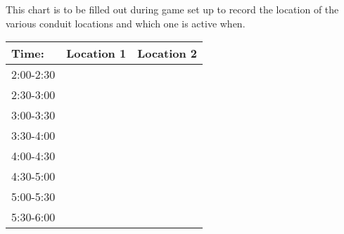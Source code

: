 \documentclass[green]{elementals}
\begin{document}
\name{\gActiveConduitLocations{}}

This chart is to be filled out during game set up to record the location of the various conduit locations and which one is active when.

\begin{tabular}{ l || l | l |}
  Time: & Location 1 & Location 2 \\ \hline \hline
  2:00-2:30 & \hspace{50mm} & \hspace{50mm} \\ \hline
  2:30-3:00 & \hspace{50mm} & \hspace{50mm} \\ \hline
  3:00-3:30 & \hspace{50mm} & \hspace{50mm} \\ \hline
  3:30-4:00 & \hspace{50mm} & \hspace{50mm} \\ \hline
  4:00-4:30 & \hspace{50mm} & \hspace{50mm} \\ \hline
  4:30-5:00 & \hspace{50mm} & \hspace{50mm} \\ \hline
  5:00-5:30 & \hspace{50mm} & \hspace{50mm} \\ \hline
  5:30-6:00 & \hspace{50mm} & \hspace{50mm} \\ \hline
\end{tabular}
\end{document}
